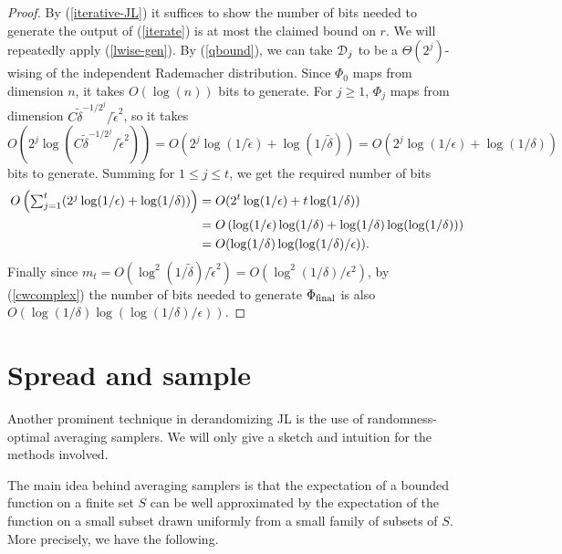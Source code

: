 \begin{proof}
  By (\ref{iterative-JL}) it suffices to show the number of bits
  needed to generate the output of (\ref{iterate}) is at most the
  claimed bound on $r$. We will repeatedly apply (\ref{lwise-gen}). By
  (\ref{qbound}), we can take $\mathcal{D}_j$ to be a $\Theta(2^j)$-wising of
  the independent Rademacher distribution. Since $\Phi_0$ maps from
  dimension $n$, it takes $O(\log(n))$ bits to generate. For $j \ge
  1$, $\Phi_j$ maps from dimension
  $C\tilde\delta^{-1/2^j}/\tilde\epsilon^2$, so it takes
  \[
  O(2^j \log(C\tilde\delta^{-1/2^j}/\tilde\epsilon^2)) = O(2^j
  \log(1/\tilde\epsilon) + \log(1/\tilde\delta)) = O(2^j
  \log(1/\epsilon) + \log(1/\delta))
  \]
  bits to generate. Summing for $1 \le j \le t$, we get the required
  number of bits
  \begin{align*}
  O\left( \textstyle{\sum_{j=1}^t (2^j \log(1/\epsilon)} +
  \log(1/\delta)) \right) &= O(2^t\log(1/\epsilon) + t \log(1/\delta))
  \\ &= O\left( \log(1/\epsilon)\log(1/\delta) +
  \log(1/\delta)\log(\log(1/\delta))\right) \\ &=
  O(\log(1/\delta)\log(\log(1/\delta)/\epsilon)).
  \end{align*}
  Finally since $m_t = O(\log^2(1/\tilde\delta)/\tilde\epsilon^2) =
  O(\log^2(1/\delta)/\epsilon^2)$, by (\ref{cwcomplex}) the number of
  bits needed to generate $\Phi_{\text{final}}$ is also
  $O(\log(1/\delta)\log(\log(1/\delta)/\epsilon))$.
\end{proof}


\renewcommand{\S}{\mathcal{S}}

\section{Spread and sample}

Another prominent technique in derandomizing JL is the use of
randomness-optimal averaging samplers. We will only give a sketch and
intuition for the methods involved.

The main idea behind averaging samplers is that the expectation of a
bounded function on a finite set $S$ can be well approximated by the
expectation of the function on a small subset drawn uniformly from a
small family of subsets of $S$. More precisely, we have the following.

